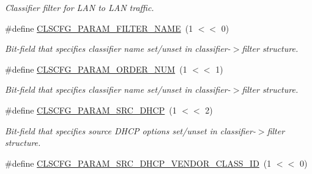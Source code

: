 \begin{DoxyCompactItemize}
\begin{DoxyCompactList}\small\item\em Classifier filter for L\-A\-N to L\-A\-N traffic. \end{DoxyCompactList}\item 
\hypertarget{group__FAPI__QOS__CLASS_ga06379cb42607da89f88b00e60eb0bcdc}{\#define \hyperlink{group__FAPI__QOS__CLASS_ga06379cb42607da89f88b00e60eb0bcdc}{C\-L\-S\-C\-F\-G\-\_\-\-P\-A\-R\-A\-M\-\_\-\-F\-I\-L\-T\-E\-R\-\_\-\-N\-A\-M\-E}~(1 $<$$<$ 0)}\label{group__FAPI__QOS__CLASS_ga06379cb42607da89f88b00e60eb0bcdc}

\begin{DoxyCompactList}\small\item\em Bit-\/field that specifies classifier name set/unset in classifier-\/$>$filter structure. \end{DoxyCompactList}\item 
\hypertarget{group__FAPI__QOS__CLASS_ga31069195eed72ec20aedae008b0a16d1}{\#define \hyperlink{group__FAPI__QOS__CLASS_ga31069195eed72ec20aedae008b0a16d1}{C\-L\-S\-C\-F\-G\-\_\-\-P\-A\-R\-A\-M\-\_\-\-O\-R\-D\-E\-R\-\_\-\-N\-U\-M}~(1 $<$$<$ 1)}\label{group__FAPI__QOS__CLASS_ga31069195eed72ec20aedae008b0a16d1}

\begin{DoxyCompactList}\small\item\em Bit-\/field that specifies classifier name set/unset in classifier-\/$>$filter structure. \end{DoxyCompactList}\item 
\hypertarget{group__FAPI__QOS__CLASS_ga3b34c97ad93e5072f0cae73fee6908e0}{\#define \hyperlink{group__FAPI__QOS__CLASS_ga3b34c97ad93e5072f0cae73fee6908e0}{C\-L\-S\-C\-F\-G\-\_\-\-P\-A\-R\-A\-M\-\_\-\-S\-R\-C\-\_\-\-D\-H\-C\-P}~(1 $<$$<$ 2)}\label{group__FAPI__QOS__CLASS_ga3b34c97ad93e5072f0cae73fee6908e0}

\begin{DoxyCompactList}\small\item\em Bit-\/field that specifies source D\-H\-C\-P options set/unset in classifier-\/$>$filter structure. \end{DoxyCompactList}\item 
\hypertarget{group__FAPI__QOS__CLASS_ga0028efb302f028380111f918050cad46}{\#define \hyperlink{group__FAPI__QOS__CLASS_ga0028efb302f028380111f918050cad46}{C\-L\-S\-C\-F\-G\-\_\-\-P\-A\-R\-A\-M\-\_\-\-S\-R\-C\-\_\-\-D\-H\-C\-P\-\_\-\-V\-E\-N\-D\-O\-R\-\_\-\-C\-L\-A\-S\-S\-\_\-\-I\-D}~(1 $<$$<$ 0)}\label{group__FAPI__QOS__CLASS_ga0028efb302f028380111f918050cad46}


\end{DoxyCompactItemize}
